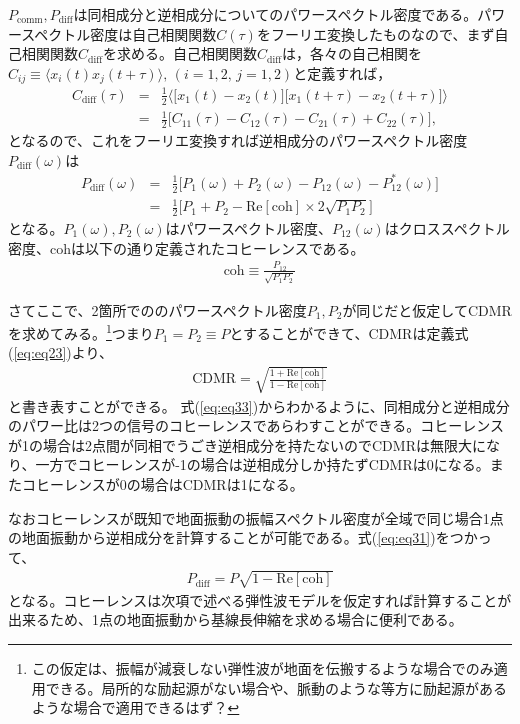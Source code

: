 \documentclass[a4paper,12pt]{book}
\begin{document}
$P_{\mathrm{comm}},P_{\mathrm{diff}}$は同相成分と逆相成分についてのパワースペクトル密度である。パワースペクトル密度は自己相関関数$C(\tau)$をフーリエ変換したものなので、まず自己相関関数$C_{\mathrm{diff}}$を求める。自己相関関数$C_{\mathrm{diff}}$は，各々の自己相関を$ C_{ij} \equiv \langle x_{i}(t)x_{j}(t+\tau)\rangle,\, (i=1,2,\,j=1,2)$と定義すれば， 
\begin{eqnarray}
  C_{\mathrm{diff}}(\tau) &=& \frac{1}{2}
  \biggl\langle
  \biggl[ x_{1}(t)-x_{2}(t) \biggr] \biggl[ x_{1}(t+\tau)-x_{2}(t+\tau) \biggr]
  \biggr\rangle \\
  &=& \frac{1}{2}\biggl[ C_{11}(\tau) - C_{12}(\tau) - C_{21}(\tau) + C_{22}(\tau) \biggr], 
\end{eqnarray}
となるので、これをフーリエ変換すれば逆相成分のパワースペクトル密度$P_{\mathrm{diff}}(\omega)$は
\begin{eqnarray}
  P_{\mathrm{diff}}(\omega) &=& \frac{1}{2}\biggl[ P_{1}(\omega) + P_{2}(\omega) - P_{12}(\omega) - P_{12}^*(\omega) \biggr]\\
  &=& \frac{1}{2} \biggl[ P_{1}+P_{2} - \mathrm{Re}\left[\mathrm{coh} \right]\times2\sqrt{P_{1}P_{2}} \biggr] \label{eq:eq31}
\end{eqnarray}
となる。$P_{1}(\omega),P_{2}(\omega)$はパワースペクトル密度、$P_{12}(\omega)$はクロススペクトル密度、$\mathrm{coh}$は以下の通り定義されたコヒーレンスである。
\begin{eqnarray}
  \mathrm{coh} \equiv \frac{P_{12}}{\sqrt{P_{1}P_{2}}}
\end{eqnarray}


さてここで、2箇所でののパワースペクトル密度$P_{1},P_{2}$が同じだと仮定してCDMRを求めてみる。\footnote[3]{この仮定は、振幅が減衰しない弾性波が地面を伝搬するような場合でのみ適用できる。局所的な励起源がない場合や、脈動のような等方に励起源があるような場合で適用できるはず？}つまり$P_{1}=P_{2}\equiv P$とすることができて、$\mathrm{CDMR}$は定義式(\ref{eq:eq23})より、
\begin{eqnarray}
 \mathrm{CDMR} = \sqrt{\frac{1 + \mathrm{Re} \left[\mathrm{coh} \right] }{1 - \mathrm{Re} \left[\mathrm{coh} \right]}} \label{eq:eq33}
\end{eqnarray}
と書き表すことができる。
式(\ref{eq:eq33})からわかるように、同相成分と逆相成分のパワー比は2つの信号のコヒーレンスであらわすことができる。コヒーレンスが1の場合は2点間が同相でうごき逆相成分を持たないのでCDMRは無限大になり、一方でコヒーレンスが-1の場合は逆相成分しか持たずCDMRは0になる。またコヒーレンスが0の場合はCDMRは1になる。

なおコヒーレンスが既知で地面振動の振幅スペクトル密度が全域で同じ場合1点の地面振動から逆相成分を計算することが可能である。式(\ref{eq:eq31})をつかって、
\begin{eqnarray}
  P_\mathrm{diff} = P \sqrt{1 - \mathrm{Re[coh]}} \label{eq:eq34}
\end{eqnarray}
となる。コヒーレンスは次項で述べる弾性波モデルを仮定すれば計算することが出来るため、1点の地面振動から基線長伸縮を求める場合に便利である。
\end{document}
